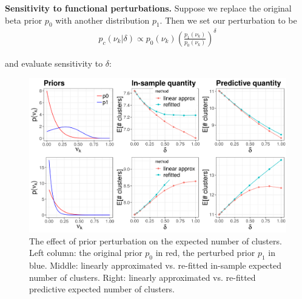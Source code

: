 \documentclass[a0,plainsections,30pt]{sciposter}\usepackage[]{graphicx}\usepackage[]{color}
\newenvironment{knitrout}{}{} %
\begin{document}
\begin{minipage}[t]{0.45\textwidth}
{\bf \large Sensitivity to functional perturbations. }
Suppose we replace the original beta prior $p_0$ with another distribution $p_1$. Then we set our perturbation to be
\vspace{-0.3in}
\begin{align*}
p_c(\nu_k \vert \delta) \propto p_{0}(\nu_k)\left(\frac{p_1(\nu_k)}{p_0(\nu_k)}\right)^\delta
\end{align*}
\vspace{-0.3in}

and evaluate sensitivity to $\delta$:
\vspace{0.1in}
\begin{figure}
\centering

\begin{knitrout}
\color{fgcolor}

{\centering \includegraphics[width=0.98\linewidth,height=0.588\linewidth]{figure/functional_sens_plot_thresh0-1} 

}



\end{knitrout}
\caption{The effect of prior perturbation on the expected number of clusters. Left column: the original prior $p_0$ in red, the perturbed prior $p_1$ in blue. Middle: linearly approximated vs.
re-fitted in-sample expected number of clusters. Right: linearly approximated vs. re-fitted predictive expected number of clusters.}
\end{figure}


\end{minipage}
\end{document}
